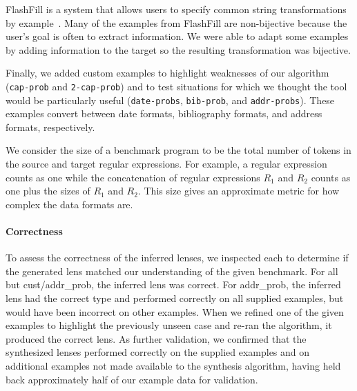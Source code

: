 \documentclass[numbers,10pt,preprint\ifanon ,nocopyrightspace\fi]{sigplanconf}
\begin{document}
FlashFill is a system that allows users to specify common string
transformations by example~\cite{gulwani-popl-2014}.  
Many of the examples from FlashFill are non-bijective because
the user's goal is often to extract information.  We were able to
adapt some examples by adding information to the target so the
resulting transformation was bijective.

Finally, we added custom examples to highlight weaknesses of
our algorithm (\texttt{cap-prob} and \texttt{2-cap-prob}) 
and to test situations for which we thought the tool would be
particularly useful (\texttt{date-probs}, \texttt{bib-prob},
and \texttt{addr-probs}).   These examples convert between date
formats, bibliography formats, and address formats, respectively.


We consider the size of a benchmark program to be the total number of
tokens in the source and target regular expressions.  
For example, a \BaseRegexType{} regular expression counts as one
while the concatenation of regular expressions $R_1$ and $R_2$ counts
as one plus the sizes of $R_1$ and $R_2$.
This size gives an approximate metric for how complex the data formats are.



\paragraph*{Correctness}
To assess the correctness of the inferred lenses, we inspected each to
determine if the generated lens matched our understanding of the given
benchmark.  For all but cust/addr\_prob, the inferred lens was correct.
For addr\_prob, the inferred lens had the correct type and performed
correctly on all supplied examples, but would have been incorrect on
other examples.  When we refined one of the given examples to
highlight the previously unseen case and re-ran the algorithm, it
produced the correct lens. As further validation, we confirmed that the
synthesized lenses performed correctly on the supplied examples and on
additional examples not made available to the synthesis algorithm,
having held back approximately half of our example data for validation.
\end{document}
